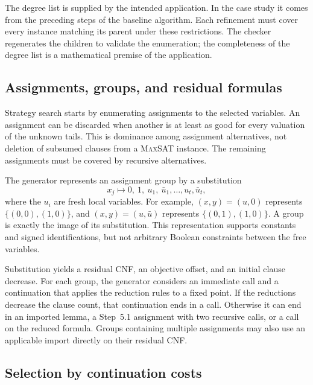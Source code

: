 \documentclass[10pt,twoside]{article}
\newcommand{\MaxSAT}{\textnormal{\textsc{MaxSAT}}}
\theoremstyle{definition}
\theoremstyle{remark}
\begin{document}
The degree list is supplied by the intended application. In the case study it
comes from the preceding steps of the baseline algorithm. Each refinement must
cover every instance matching its parent under these restrictions. The checker
regenerates the children to validate the enumeration; the completeness of the
degree list is a mathematical premise of the application.

\subsection{Assignments, groups, and residual formulas}
\label{sec:group-search}

Strategy search starts by enumerating assignments to the selected variables.
An assignment can be discarded when another is at least as good for every
valuation of the unknown tails. This is dominance among assignment
alternatives, not deletion of subsumed clauses from a \MaxSAT{} instance.
The remaining assignments must be covered by recursive alternatives.

The generator represents an assignment group by a substitution
\begin{equation}
 x_j\longmapsto 0,\ 1,\ u_1,\ \bar u_1,\ldots,u_t,\bar u_t,
 \label{eq:substitution}
\end{equation}
where the $u_i$ are fresh local variables. For example, $(x,y)=(u,0)$
represents $\{(0,0),(1,0)\}$, and $(x,y)=(u,\bar u)$ represents
$\{(0,1),(1,0)\}$. A group is exactly the image of its substitution.
This representation supports constants and signed identifications, but not
arbitrary Boolean constraints between the free variables.

Substitution yields a residual CNF, an objective offset, and an initial
clause decrease. For each group, the generator considers an immediate call
and a continuation that applies the reduction rules to a fixed point. If the
reductions decrease the clause count, that continuation ends in a call.
Otherwise it can end in an imported lemma, a Step~5.1 assignment with two
recursive calls, or a call on the reduced formula. Groups containing multiple
assignments may also use an applicable import directly on their residual CNF.

\subsection{Selection by continuation costs}
\label{sec:fixed-target}
\end{document}

